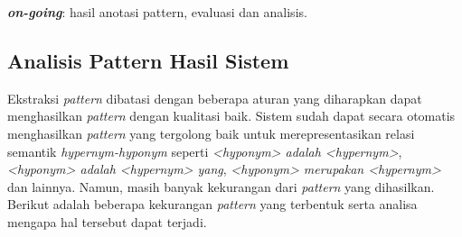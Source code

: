 \noindent \textbf{\textit{on-going}}: hasil anotasi pattern, evaluasi dan analisis.


\subsection{Analisis Pattern Hasil Sistem}
Ekstraksi \textit{pattern} dibatasi dengan beberapa aturan yang diharapkan dapat menghasilkan \textit{pattern} dengan kualitasi baik. Sistem sudah dapat secara otomatis menghasilkan \textit{pattern} yang tergolong baik untuk merepresentasikan relasi semantik \textit{hypernym-hyponym} seperti \textit{<hyponym> adalah <hypernym>}, \textit{<hyponym> adalah <hypernym> yang}, \textit{<hyponym> merupakan <hypernym>} dan lainnya. Namun, masih banyak kekurangan dari \textit{pattern} yang dihasilkan. Berikut adalah beberapa kekurangan \textit{pattern} yang terbentuk serta analisa mengapa hal tersebut dapat terjadi.

